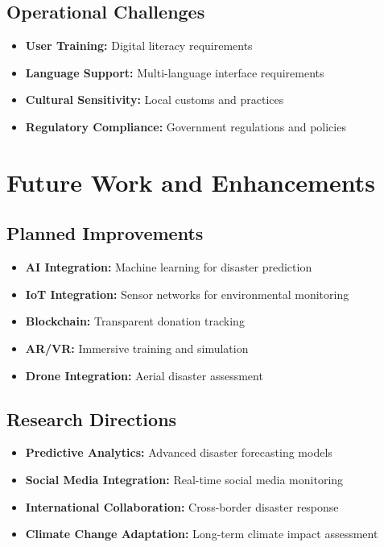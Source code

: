 \documentclass[12pt,a4paper]{article}
\begin{document}
\subsection{Operational Challenges}

\begin{itemize}
    \item \textbf{User Training:} Digital literacy requirements
    \item \textbf{Language Support:} Multi-language interface requirements
    \item \textbf{Cultural Sensitivity:} Local customs and practices
    \item \textbf{Regulatory Compliance:} Government regulations and policies
\end{itemize}

\section{Future Work and Enhancements}

\subsection{Planned Improvements}

\begin{itemize}
    \item \textbf{AI Integration:} Machine learning for disaster prediction
    \item \textbf{IoT Integration:} Sensor networks for environmental monitoring
    \item \textbf{Blockchain:} Transparent donation tracking
    \item \textbf{AR/VR:} Immersive training and simulation
    \item \textbf{Drone Integration:} Aerial disaster assessment
\end{itemize}

\subsection{Research Directions}

\begin{itemize}
    \item \textbf{Predictive Analytics:} Advanced disaster forecasting models
    \item \textbf{Social Media Integration:} Real-time social media monitoring
    \item \textbf{International Collaboration:} Cross-border disaster response
    \item \textbf{Climate Change Adaptation:} Long-term climate impact assessment
\end{itemize}
\end{document}
